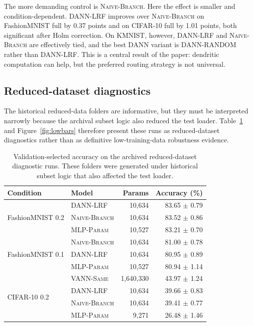 \documentclass[preprint,12pt]{elsarticle}
\newcommand{\DANNLRF}{\textsc{DANN-LRF}}
\newcommand{\DANNRANDOM}{\textsc{DANN-RANDOM}}
\newcommand{\NAIVEBRANCH}{\textsc{Naive-Branch}}
\newcommand{\MLPPARAM}{\textsc{MLP-Param}}
\newcommand{\VANNSAME}{\textsc{VANN-Same}}
\begin{document}
The more demanding control is \NAIVEBRANCH{}. Here the effect is smaller and condition-dependent. \DANNLRF{} improves over \NAIVEBRANCH{} on FashionMNIST full by 0.37 points and on CIFAR-10 full by 1.01 points, both significant after Holm correction. On KMNIST, however, \DANNLRF{} and \NAIVEBRANCH{} are effectively tied, and the best DANN variant is \DANNRANDOM{} rather than \DANNLRF{}. This is a central result of the paper: dendritic computation can help, but the preferred routing strategy is not universal.

\subsection{Reduced-dataset diagnostics}
\label{sec:lowresults}

The historical reduced-data folders are informative, but they must be interpreted narrowly because the archival subset logic also reduced the test loader. Table~\ref{tab:low} and Figure~\ref{fig:lowbars} therefore present these runs as reduced-dataset diagnostics rather than as definitive low-training-data robustness evidence.

\begin{table}[ht]
\centering
\caption{Validation-selected accuracy on the archived reduced-dataset diagnostic runs. These folders were generated under historical subset logic that also affected the test loader.}
\label{tab:low}
\small
\begin{tabular}{llrr}
\toprule
\textbf{Condition} & \textbf{Model} & \textbf{Params} & \textbf{Accuracy (\%)} \\
\midrule
\multirow{3}{*}{FashionMNIST 0.2}
& \DANNLRF{} & 10,634 & 83.65 $\pm$ 0.79 \\
& \NAIVEBRANCH{} & 10,634 & 83.52 $\pm$ 0.86 \\
& \MLPPARAM{} & 10,527 & 83.21 $\pm$ 0.70 \\
\midrule
\multirow{3}{*}{FashionMNIST 0.1}
& \NAIVEBRANCH{} & 10,634 & 81.00 $\pm$ 0.78 \\
& \DANNLRF{} & 10,634 & 80.95 $\pm$ 0.89 \\
& \MLPPARAM{} & 10,527 & 80.94 $\pm$ 1.14 \\
\midrule
\multirow{4}{*}{CIFAR-10 0.2}
& \VANNSAME{} & 1,640,330 & 43.97 $\pm$ 1.24 \\
& \DANNLRF{} & 10,634 & 39.66 $\pm$ 0.83 \\
& \NAIVEBRANCH{} & 10,634 & 39.41 $\pm$ 0.77 \\
& \MLPPARAM{} & 9,271 & 26.48 $\pm$ 1.46 \\
\bottomrule
\end{tabular}
\end{table}
\end{document}
